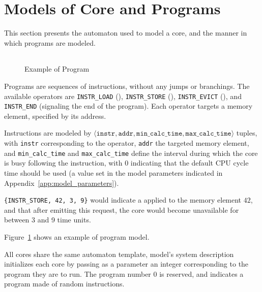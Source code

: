\section{Models of Core and Programs}
\label{sec:model:core}
This section presents the automaton used to model a core, and the manner in
which programs are modeled.

\begin{figure}[hbt!]
\begin{center}
\begin{tabular}{c}

\end{tabular}
\end{center}
\caption{Example of Program}
\label{fig:UPPAAL:program}
\end{figure}

Programs are sequences of instructions, without any jumps or branchings. The
available operators are \lstinline{INSTR_LOAD} (\loadinstr{}),
\lstinline{INSTR_STORE} (\storeinstr{}), \lstinline{INSTR_EVICT}
(\evictinstr{}), and \lstinline{INSTR_END} (signaling the end of the program).
Each operator targets a memory element, specified by its address.

\begin{definition}
Instructions are modeled by $\langle \texttt{instr}, \texttt{addr},
\texttt{min\_calc\_time}, \allowbreak{} \texttt{max\_calc\_time} \rangle$
tuples, with \texttt{instr} corresponding to the operator, \texttt{addr} the
targeted memory element, and \texttt{min\_calc\_time} and
\texttt{max\_calc\_time} define the interval during which the core is busy
following the instruction, with 0 indicating that the default CPU cycle time
should be used (a value set in the model parameters indicated in
Appendix~\ref{app:model_parameters}).
\end{definition}
\begin{example}
\lstinline!{INSTR_STORE, 42, 3, 9}! would indicate a \storeinstr{} applied to
the memory element $42$, and that after emitting this request, the core would
become unavailable for between 3 and 9 time units.
\end{example}

Figure~\ref{fig:UPPAAL:program} shows an example of program model.

All cores share the same automaton template, model's system description
initializes each core by passing as a parameter an integer corresponding to the
program they are to run.  The program number 0 is reserved, and indicates a
program made of random instructions.

